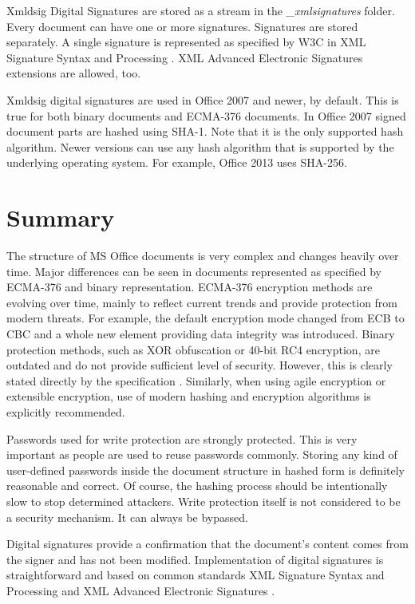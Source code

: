 \documentclass[11pt,oneside]{fithesis2}
\begin{document}
Xmldsig Digital Signatures are stored as a stream in the \textit{\_xmlsignatures} folder. Every document can have one or more signatures. Signatures are stored separately. A single signature is represented as specified by W3C in XML Signature Syntax and Processing \cite{xmlsig}. XML Advanced Electronic Signatures \cite{xades} extensions are allowed, too.

Xmldsig digital signatures are used in Office 2007 and newer, by default. This is true for both binary documents and ECMA-376 documents. In Office 2007 signed document parts are hashed using SHA-1. Note that it is the only supported hash algorithm. Newer versions can use any hash algorithm that is supported by the underlying operating system. For example, Office 2013 uses SHA-256.

\section{Summary}

The structure of MS Office documents is very complex and changes heavily over time. Major differences can be seen in documents represented as specified by ECMA-376 and binary representation. ECMA-376 encryption methods are evolving over time, mainly to reflect current trends and provide protection from modern threats. For example, the default encryption mode changed from ECB to CBC and a whole new element providing data integrity was introduced. Binary protection methods, such as XOR obfuscation or 40-bit RC4 encryption, are outdated and do not provide sufficient level of security. However, this is clearly stated directly by the specification \cite[p. 93]{msoffcrypto}. Similarly, when using agile encryption or extensible encryption, use of modern hashing and encryption algorithms is explicitly recommended.

Passwords used for write protection are strongly protected. This is very important as people are used to reuse passwords commonly. Storing any kind of user-defined passwords inside the document structure in hashed form is definitely reasonable and correct. Of course, the hashing process should be intentionally slow to stop determined attackers. Write protection itself is not considered to be a security mechanism. It can always be bypassed. 

Digital signatures provide a confirmation that the document's content comes from the signer and has not been modified. Implementation of digital signatures is straightforward and based on common standards XML Signature Syntax and Processing \cite{xmlsig} and XML Advanced Electronic Signatures \cite{xades}. 
\end{document}
